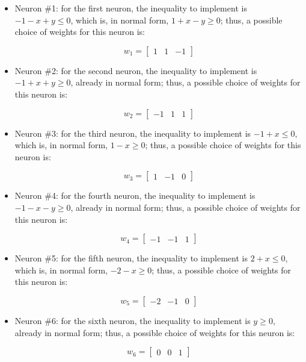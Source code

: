 \documentclass[letterpaper,headings=standardclasses]{scrartcl}
\begin{document}
\begin{itemize}

\item Neuron \#1: for the first neuron, the inequality to implement is $-1 -x +y \le 0$, which is, in normal form, $1 +x -y \ge 0$; thus, a possible choice of weights for this neuron is:

$$ w_1 = [\begin{matrix} 1 & 1 & -1 \end{matrix}] $$

\item Neuron \#2: for the second neuron, the inequality to implement is $-1 +x +y \ge 0$, already in normal form; thus, a possible choice of weights for this neuron is:

$$ w_2 = [\begin{matrix} -1 & 1 & 1 \end{matrix}] $$

\item Neuron \#3: for the third neuron, the inequality to implement is $-1 +x \le 0$, which is, in normal form, $1 -x \ge 0$; thus, a possible choice of weights for this neuron is:

$$ w_3 = [\begin{matrix} 1 & -1 & 0 \end{matrix}] $$

\item Neuron \#4: for the fourth neuron, the inequality to implement is $-1 -x -y \ge 0$, already in normal form; thus, a possible choice of weights for this neuron is:

$$ w_4 = [\begin{matrix} -1 & -1 & 1 \end{matrix}] $$

\item Neuron \#5: for the fifth neuron, the inequality to implement is $2 +x \le 0$, which is, in normal form, $-2 -x \ge 0$; thus, a possible choice of weights for this neuron is:

$$ w_5 = [\begin{matrix} -2 & -1 & 0 \end{matrix}] $$

\item Neuron \#6: for the sixth neuron, the inequality to implement is $y \ge 0$, already in normal form; thus, a possible choice of weights for this neuron is:

$$ w_6 = [\begin{matrix} 0 & 0 & 1 \end{matrix}] $$

\end{itemize}
\end{document}
